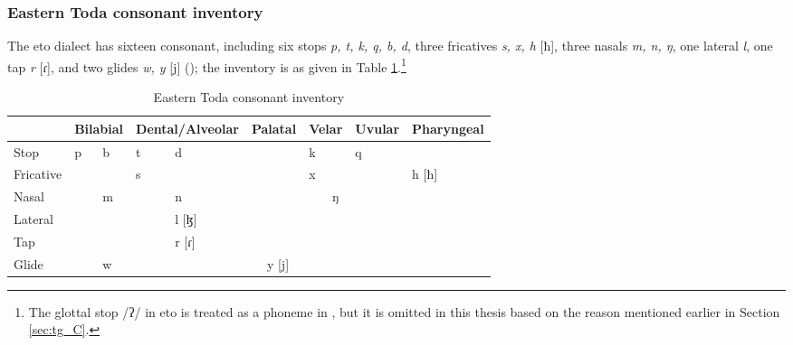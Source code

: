 \subsubsection{Eastern Toda consonant inventory}

The \acl{eto} dialect has sixteen consonant, including six stops \textit{p, t, k, q, b, d}, three fricatives \textit{s, x, h} [ħ], three nasals \textit{m, n, ŋ}, one lateral \textit{l}, one tap \textit{r} [ɾ], and two glides \textit{w, y} [j] (\cite{lee2015tawsa}); the inventory is as given in Table \ref{tab:etoC}.\footnote{The glottal stop /ʔ/ in \acl{eto} is treated as a phoneme in \textcite{lee2015tawsa}, but it is omitted in this thesis based on the reason mentioned earlier in Section \ref{sec:tg_C}.}

\begin{table}[!htbp]
\centering
\caption{Eastern Toda consonant inventory}
\label{tab:etoC}
\begin{tabular}{l|ll|ll|ll|ll|ll|ll}
\hline
                    & \multicolumn{2}{c|}{Bilabial} & \multicolumn{2}{c|}{Dental/Alveolar} & \multicolumn{2}{c|}{Palatal} & \multicolumn{2}{c|}{Velar} & \multicolumn{2}{c|}{Uvular} & \multicolumn{2}{c}{Pharyngeal} \\ \hline
Stop                & p            & b           & t \quad\quad\quad          & d               &             &               & k          &            & q            &            &                 &              \\
Fricative           &               &              & s               &                  &             &               & x          &             &               &            & h [ħ]             &              \\
Nasal               &               & m           &                  & n               &             &               &             & ŋ          &               &            &                 &              \\
Lateral &               &              &                  & l [ɮ]             &             &               &             &             &               &            &                 &              \\
Tap                 &               &              &                  & r [ɾ]              &             &               &             &             &               &            &                 &              \\
Glide               &               & w           &                  &                  &             & y [j]           &             &             &               &            &                 &              \\ \hline
\end{tabular}
\end{table}

